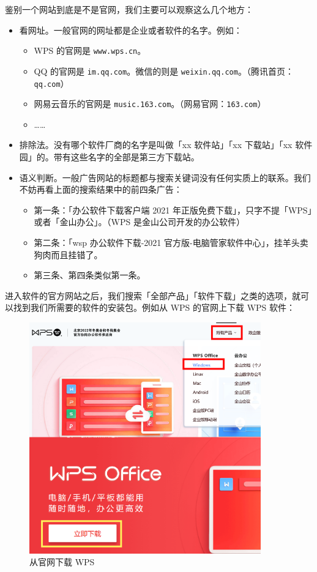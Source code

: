 鉴别一个网站到底是不是官网，我们主要可以观察这么几个地方：

\begin{itemize}
  \item 看网址。一般官网的网址都是企业或者软件的名字。例如：
  \begin{itemize}
    \item WPS 的官网是 \verb|www.wps.cn|。
    \item QQ 的官网是 \verb|im.qq.com|。微信的则是 \verb|weixin.qq.com|。（腾讯首页：\verb|qq.com|）
    \item 网易云音乐的官网是 \verb|music.163.com|。（网易官网：\verb|163.com|）
    \item ……
  \end{itemize}
  \item 排除法。没有哪个软件厂商的名字是叫做「xx 软件站」「xx 下载站」「xx 软件园」的。带有这些名字的全部是第三方下载站。
  \item 语义判断。一般广告网站的标题都与搜索关键词没有任何实质上的联系。我们不妨再看上面的搜索结果中的前四条广告：
  \begin{itemize}
    \item 第一条：「办公软件下载客户端 2021 年正版免费下载」，只字不提「WPS」或者「金山办公」。（WPS 是金山公司开发的办公软件）
    \item 第二条：「wsp 办公软件下载-2021 官方版-电脑管家软件中心」，挂羊头卖狗肉而且挂错了。
    \item 第三条、第四条类似第一条。
  \end{itemize}
\end{itemize}

进入软件的官方网站之后，我们搜索「全部产品」「软件下载」之类的选项，就可以找到我们所需要的软件的安装包。例如从 WPS 的官网上下载 WPS 软件：

\begin{figure}[htb!]
  \centering
  \includegraphics[width=10cm]{assets/Download_WPS.png}
  \caption{从官网下载 WPS}
  \label{download-wps}
\end{figure}

